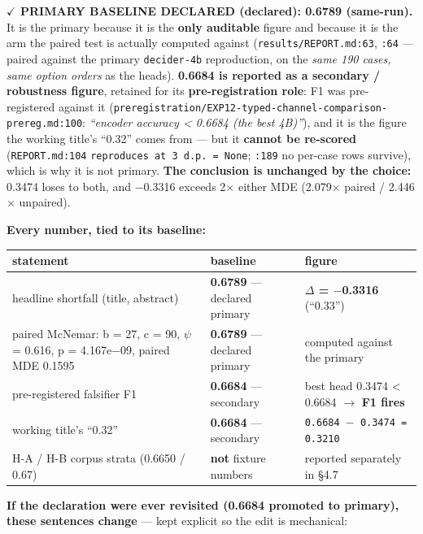 \documentclass[10pt]{article}
\begin{document}
\textbf{$\checkmark$ PRIMARY BASELINE DECLARED (declared): 0.6789 (same-run).} It is the primary because it is the \textbf{only auditable} figure and because it is the arm the paired test is actually computed against (\texttt{results/REPORT.md:63}, \texttt{:64} --- paired against the primary \texttt{decider-4b} reproduction, on the \emph{same 190 cases, same option orders} as the heads). \textbf{0.6684 is reported as a secondary / robustness figure}, retained for its \textbf{pre-registration role}: F1 was pre-registered against it (\texttt{preregistration/EXP12-typed-channel-comparison-prereg.md:100}: \emph{``encoder accuracy < 0.6684 (the best 4B)''}), and it is the figure the working title's ``0.32'' comes from --- but it \textbf{cannot be re-scored} (\texttt{REPORT.md:104} \texttt{reproduces at 3 d.p. = None}; \texttt{:189} no per-case rows survive), which is why it is not primary. \textbf{The conclusion is unchanged by the choice:} 0.3474 loses to both, and $-$0.3316 exceeds 2$\times$ either MDE (2.079$\times$ paired / 2.446$\times$ unpaired).

\textbf{Every number, tied to its baseline:}


\begin{center}
\begin{tabular}{@{}>{\raggedright\arraybackslash}p{}>{\raggedright\arraybackslash}p{}>{\raggedright\arraybackslash}p{}@{}}
\hline
\textbf{statement} & \textbf{baseline} & \textbf{figure} \\ \hline
headline shortfall (title, abstract) & \textbf{0.6789} --- declared primary & \textbf{$\Delta$ = $-$0.3316} (``0.33'') \\ \hline
paired McNemar: b = 27, c = 90, $\psi$ = 0.616, p = 4.167e$-$09, paired MDE 0.1595 & \textbf{0.6789} --- declared primary & computed against the primary \\ \hline
pre-registered falsifier F1 & \textbf{0.6684} --- secondary & best head 0.3474 < 0.6684 $\to$ \textbf{F1 fires} \\ \hline
working title's ``0.32'' & \textbf{0.6684} --- secondary & \texttt{0.6684 $-$ 0.3474 = 0.3210} \\ \hline
H-A / H-B corpus strata (0.6650 / 0.67) & \textbf{not} fixture numbers & reported separately in \S4.7 \\ \hline
\end{tabular}
\end{center}

\textbf{If the declaration were ever revisited (0.6684 promoted to primary), these sentences change} --- kept explicit so the edit is mechanical:
\end{document}
